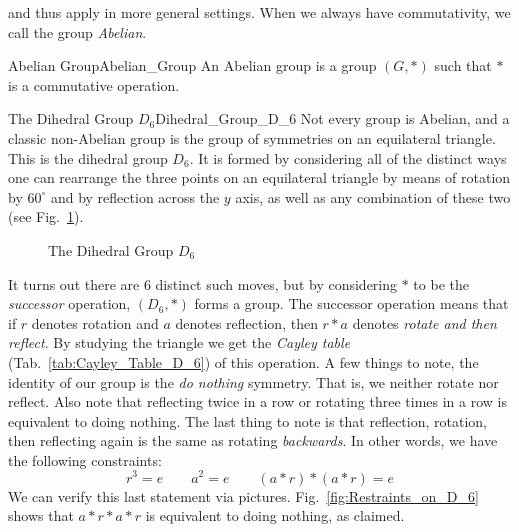     and thus apply in more general settings. When we always have commutativity,
    we call the group \textit{Abelian}.
    \begin{fdefinition}{Abelian Group}{Abelian_Group}
        An \gls{Abelian group} is a \gls{group} $(G,*)$ such that $*$ is
        a \gls{commutative operation}.
    \end{fdefinition}
    \begin{lexample}{The Dihedral Group $D_{6}$}{Dihedral_Group_D_6}
        Not every group is Abelian, and a classic non-Abelian group is the group
        of symmetries on an equilateral triangle. This is the dihedral group
        $D_{6}$. It is formed by considering all of the distinct ways one can
        rearrange the three points on an equilateral triangle by means of
        rotation by $60^{\circ}$ and by reflection across the $y$ axis, as well
        as any combination of these two (see Fig.~\ref{fig:Dihedral_Group_D_6}).
        \begin{figure}[H]
            \centering
            \captionsetup{type=figure}
            
            \caption{The Dihedral Group $D_{6}$}
            \label{fig:Dihedral_Group_D_6}
        \end{figure}
        It turns out there are 6 distinct such moves, but by considering $*$ to
        be the \textit{successor} operation, $(D_{6},*)$ forms a group. The
        successor operation means that if $r$ denotes rotation and $a$ denotes
        reflection, then $r*a$ denotes \textit{rotate and then reflect}. By
        studying the triangle we get the \textit{Cayley table}
        (Tab.~\ref{tab:Cayley_Table_D_6}) of this operation. A few things to
        note, the identity of our group is the \textit{do nothing} symmetry.
        That is, we neither rotate nor reflect. Also note that reflecting twice
        in a row or rotating three times in a row is equivalent to doing
        nothing. The last thing to note is that reflection, rotation, then
        reflecting again is the same as rotating \textit{backwards}. In other
        words, we have the following constraints:
        \begin{equation}
            r^{3}=e
            \quad\quad
            a^{2}=e
            \quad\quad
            (a*r)*(a*r)=e
        \end{equation}
        We can verify this last statement via pictures.
        Fig.~\ref{fig:Restraints_on_D_6} shows that $a*r*a*r$ is equivalent to
        doing nothing, as claimed.

\end{lexample}
